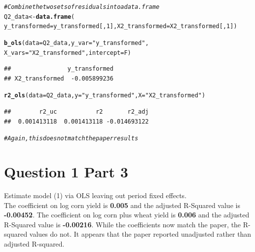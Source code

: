 \documentclass[english, 11pt]{article}\usepackage[]{graphicx}\usepackage[]{color}
\makeatletter
\newcommand{\hlnum}[1]{\textcolor[rgb]{0.686,0.059,0.569}{#1}}%
\newcommand{\hlstr}[1]{\textcolor[rgb]{0.192,0.494,0.8}{#1}}%
\newcommand{\hlcom}[1]{\textcolor[rgb]{0.678,0.584,0.686}{\textit{#1}}}%
\newcommand{\hlstd}[1]{\textcolor[rgb]{0.345,0.345,0.345}{#1}}%
\newcommand{\hlkwb}[1]{\textcolor[rgb]{0.69,0.353,0.396}{#1}}%
\newcommand{\hlkwc}[1]{\textcolor[rgb]{0.333,0.667,0.333}{#1}}%
\newcommand{\hlkwd}[1]{\textcolor[rgb]{0.737,0.353,0.396}{\textbf{#1}}}%
\newenvironment{kframe}{%
 \def\at@end@of@kframe{}%
 \ifinner\ifhmode%
  \def\at@end@of@kframe{\end{minipage}}%
  \begin{minipage}{\columnwidth}%
 \fi\fi%
 \def\FrameCommand##1{\hskip\@totalleftmargin \hskip-\fboxsep
 \colorbox{shadecolor}{##1}\hskip-\fboxsep
     \hskip-\linewidth \hskip-\@totalleftmargin \hskip\columnwidth}%
 \MakeFramed {\advance\hsize-\width
   \@totalleftmargin\z@ \linewidth\hsize
   \@setminipage}}%
 {\par\unskip\endMakeFramed%
 \at@end@of@kframe}
\newenvironment{knitrout}{}{} %
\makeatother
\begin{document}
\begin{knitrout}
\begin{kframe}
\begin{alltt}
\hlcom{# Combine the two sets of residuals into a data.frame}
\hlstd{Q2_data} \hlkwb{<-} \hlkwd{data.frame}\hlstd{(}
  \hlkwc{y_transformed} \hlstd{= y_transformed[,}\hlnum{1}\hlstd{],} \hlkwc{X2_transformed} \hlstd{= X2_transformed[,}\hlnum{1}\hlstd{])}


\hlkwd{b_ols}\hlstd{(}\hlkwc{data} \hlstd{= Q2_data,} \hlkwc{y_var} \hlstd{=} \hlstr{"y_transformed"}\hlstd{,}
      \hlkwc{X_vars} \hlstd{=} \hlstr{"X2_transformed"}\hlstd{,} \hlkwc{intercept} \hlstd{= F)}
\end{alltt}
\begin{verbatim}
##                y_transformed
## X2_transformed  -0.005899236
\end{verbatim}
\begin{alltt}
\hlkwd{r2_ols}\hlstd{(}\hlkwc{data} \hlstd{= Q2_data,} \hlkwc{y} \hlstd{=} \hlstr{"y_transformed"}\hlstd{,} \hlkwc{X} \hlstd{=} \hlstr{"X2_transformed"}\hlstd{)}
\end{alltt}
\begin{verbatim}
##        r2_uc           r2       r2_adj 
##  0.001413118  0.001413118 -0.014693122
\end{verbatim}
\begin{alltt}
\hlcom{# Again, this does not match the paper results }
\end{alltt}
\end{kframe}
\end{knitrout}


\newpage
\noindent \section*{Question 1 Part 3} Estimate model (1) via OLS leaving out period fixed effects. \\
\vspace{2mm}
\newline
\noindent The coefficient on log corn yield is \textbf{0.005} and the adjusted R-Squared value is \textbf{-0.00452}.
The coefficient on log corn plus wheat yield is \textbf{0.006} and the adjusted R-Squared value is \textbf{-0.00216}. 
\bigskip 
\newline
While the coefficients now match the paper, the R-squared values do not. It appears that the paper reported unadjusted rather than adjusted R-squared. 
\end{document}
